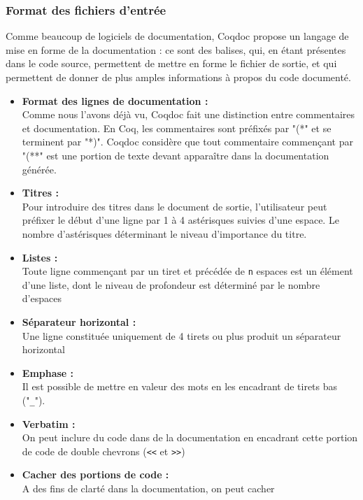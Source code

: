 \documentclass[a4paper, 11pt]{report}
\begin{document}
    \subsubsection{Format des fichiers d'entrée}
    Comme beaucoup de logiciels de documentation, Coqdoc propose un langage de
    mise en forme de la documentation : ce sont des balises, qui, en étant
    présentes dans le code source, permettent de mettre en forme le fichier de sortie,
    et qui permettent de donner de plus amples informations à propos du code
    documenté.
    \begin{itemize}
      \item[] \textbf{Format des lignes de documentation :} \\
      Comme nous l'avons déjà vu, Coqdoc fait une distinction entre commentaires
      et documentation. En Coq, les commentaires sont préfixés par "(*" et se
      terminent par "*)". Coqdoc considère que tout commentaire commençant par
      "(**" est une portion de texte devant apparaître dans la documentation
      générée.
      \item[] \textbf{Titres :} \\
      Pour introduire des titres dans le document de sortie, l'utilisateur
      peut préfixer le début d'une ligne par 1 à 4 astérisques suivies d'une
      espace. Le nombre d'astérisques déterminant le niveau d'importance du
      titre.
      \item[] \textbf{Listes :} \\
        Toute ligne commençant par un tiret et précédée de \texttt{n} espaces
        est un élément d'une liste, dont le niveau de profondeur est déterminé
        par le nombre d'espaces
      \item[] \textbf{Séparateur horizontal :} \\
        Une ligne constituée uniquement de 4 tirets ou plus produit un
        séparateur horizontal
      \item[] \textbf{Emphase :} \\
        Il est possible de mettre en valeur des mots en les encadrant
        de tirets bas ("\texttt{\_}").
      \item[] \textbf{Verbatim :} \\
        On peut inclure du code dans de la documentation en encadrant cette
        portion de code de double chevrons (\texttt{<<} et \texttt{>>})
      \item[] \textbf{Cacher des portions de code :} \\
        A des fins de clarté dans la documentation, on peut cacher

\end{itemize}
\end{document}
